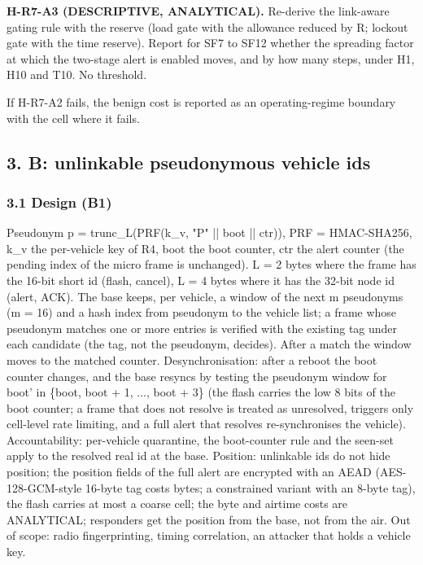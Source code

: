 \textbf{H-R7-A3 (DESCRIPTIVE, ANALYTICAL).} Re-derive the link-aware gating rule with the reserve (load gate with the allowance reduced by R; lockout gate with the time reserve). Report for SF7 to SF12 whether the spreading factor at which the two-stage alert is enabled moves, and by how many steps, under H1, H10 and T10. No threshold.

If H-R7-A2 fails, the benign cost is reported as an operating-regime boundary with the cell where it fails.

\subsection*{3. B: unlinkable pseudonymous vehicle ids}

\subsubsection*{3.1 Design (B1)}

Pseudonym p = trunc\_L(PRF(k\_v, "P" || boot || ctr)), PRF = HMAC-SHA256, k\_v the per-vehicle key of R4, boot the boot counter, ctr the alert counter (the pending index of the micro frame is unchanged). L = 2 bytes where the frame has the 16-bit short id (flash, cancel), L = 4 bytes where it has the 32-bit node id (alert, ACK). The base keeps, per vehicle, a window of the next m pseudonyms (m = 16) and a hash index from pseudonym to the vehicle list; a frame whose pseudonym matches one or more entries is verified with the existing tag under each candidate (the tag, not the pseudonym, decides). After a match the window moves to the matched counter. Desynchronisation: after a reboot the boot counter changes, and the base resyncs by testing the pseudonym window for boot' in \{boot, boot + 1, ..., boot + 3\} (the flash carries the low 8 bits of the boot counter; a frame that does not resolve is treated as unresolved, triggers only cell-level rate limiting, and a full alert that resolves re-synchronises the vehicle). Accountability: per-vehicle quarantine, the boot-counter rule and the seen-set apply to the resolved real id at the base. Position: unlinkable ids do not hide position; the position fields of the full alert are encrypted with an AEAD (AES-128-GCM-style 16-byte tag costs bytes; a constrained variant with an 8-byte tag), the flash carries at most a coarse cell; the byte and airtime costs are ANALYTICAL; responders get the position from the base, not from the air. Out of scope: radio fingerprinting, timing correlation, an attacker that holds a vehicle key.

